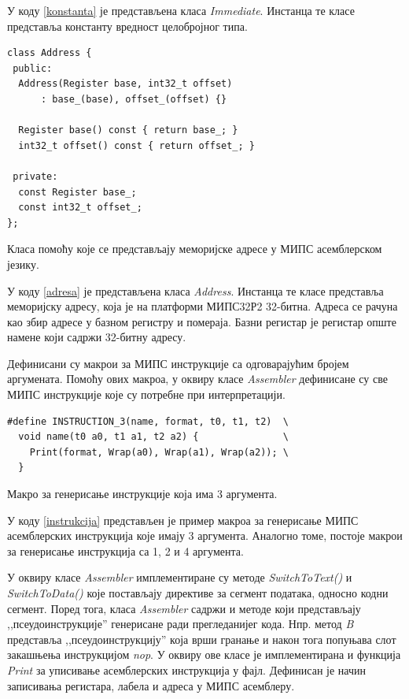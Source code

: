 \documentclass[12pt,oneside]{memoir}
\begin{document}
У коду \ref{konstanta} је представљена класа \textit{Immediate}. Инстанца те класе представља константу вредност целобројног типа.\\

\begin{listing}
\begin{verbatim}
class Address {
 public:
  Address(Register base, int32_t offset)
      : base_(base), offset_(offset) {}

  Register base() const { return base_; }
  int32_t offset() const { return offset_; }

 private:
  const Register base_;
  const int32_t offset_;
};
\end{verbatim}
\caption{Класа помоћу које се представљају меморијске адресе у МИПС асемблерском језику.}
\label{adresa}
\end{listing}

У коду \ref{adresa} је представљена класа \textit{Address}. Инстанца те класе представља меморијску адресу, која је на платформи МИПС32Р2 32-битна. Адреса се рачуна као збир адресе у базном регистру и помераја. Базни регистар је регистар опште намене који садржи 32-битну адресу. 

Дефинисани су макрои за МИПС инструкције са одговарајућим бројем аргумената. Помоћу ових макроа, у оквиру класе \textit{Assembler} дефинисане су све МИПС инструкције које су потребне при интерпретацији.\\

\begin{listing}
\begin{verbatim}
#define INSTRUCTION_3(name, format, t0, t1, t2)  \
  void name(t0 a0, t1 a1, t2 a2) {               \
    Print(format, Wrap(a0), Wrap(a1), Wrap(a2)); \
  }
\end{verbatim}
\caption{Макро за генерисање инструкције која има 3 аргумента.}
\label{instrukcija}
\end{listing}

У коду \ref{instrukcija} представљен је пример макроа за генерисање МИПС асемблерских инструкција које имају 3 аргумента. Аналогно томе, постоје макрои за генерисање инструкција са 1, 2 и 4 аргумента.

У оквиру класе \textit{Assembler} имплементиране су методе \textit{SwitchToText()} и \textit{SwitchToData()} које постављају директиве за сегмент података, односно кодни сегмент. Поред тога, класа \textit{Assembler} садржи и методе који представљају ,,псеудоинструкције'' генерисане ради прегледанијег кода. Нпр. метод \textit{B} представља ,,псеудоинструкцију'' која врши гранање и након тога попуњава слот закашњења инструкцијом \textit{nop}. 
У оквиру ове класе је имплементирана и функција \textit{Print} за уписивање асемблерских инструкција у фајл. Дефинисан је начин записивања регистара, лабела и адреса у МИПС асемблеру.\\
\end{document}
